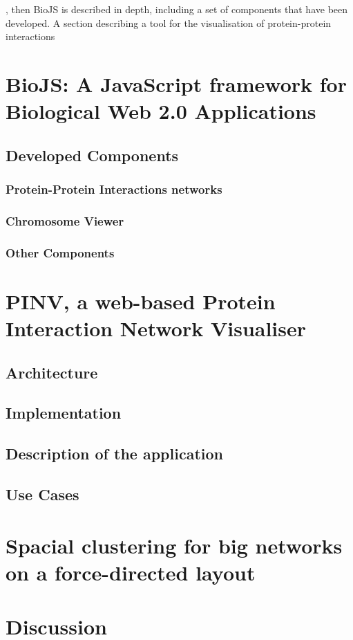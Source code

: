 

, then BioJS is described in depth, including a set of components that have been developed. A section describing a tool for the visualisation of protein-protein interactions 


\section{BioJS: A JavaScript framework for Biological Web 2.0 Applications }
\subsection{Developed Components}
\subsubsection{Protein-Protein Interactions networks}
\subsubsection{Chromosome Viewer}
\subsubsection{Other Components}

\section{PINV, a web-based Protein Interaction Network Visualiser }
\subsection{Architecture}
\subsection{Implementation}
\subsection{Description of the application}
\subsection{Use Cases}

\section{Spacial clustering for big networks on a force-directed layout}

\section{Discussion}


